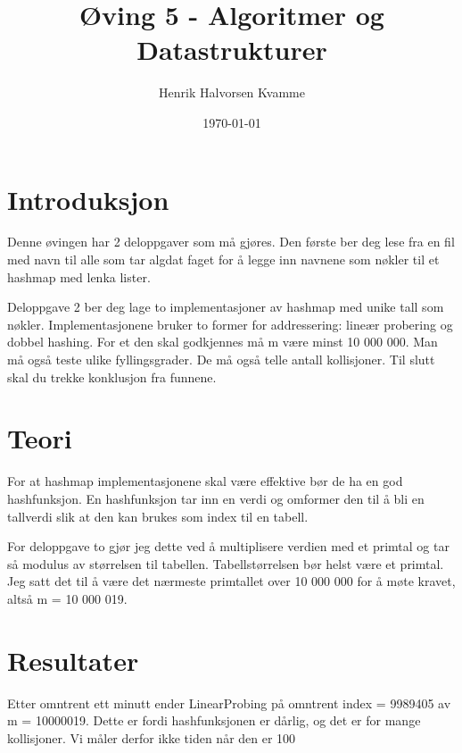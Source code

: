 \documentclass[12pt,a4paper]{article}
\title{Øving 5 - Algoritmer og Datastrukturer}
\author{Henrik Halvorsen Kvamme}
\date{\today}
\begin{document}
\maketitle

\section{Introduksjon}
Denne øvingen har 2 deloppgaver som må gjøres. Den første ber deg lese fra en fil med navn til alle som tar algdat faget for å legge inn navnene som nøkler til et hashmap med lenka lister.

Deloppgave 2 ber deg lage to implementasjoner av hashmap med unike tall som nøkler. Implementasjonene bruker to former for addressering: lineær probering og dobbel hashing. For et den skal godkjennes må m være minst 10 000 000. Man må også teste ulike fyllingsgrader. De må også telle antall kollisjoner. Til slutt skal du trekke konklusjon fra funnene.

\section{Teori}
For at hashmap implementasjonene skal være effektive bør de ha en god hashfunksjon. En hashfunksjon tar inn en verdi og omformer den til å bli en tallverdi slik at den kan brukes som index til en tabell.

For deloppgave to gjør jeg dette ved å multiplisere verdien med et primtal og tar så modulus av størrelsen til tabellen. Tabellstørrelsen bør helst være et primtal. Jeg satt det til å være det nærmeste primtallet over 10 000 000 for å møte kravet, altså m = 10 000 019.

\newpage

\section{Resultater}
Etter omntrent ett minutt ender LinearProbing på omntrent index = 9989405 av m = 10000019.
Dette er fordi hashfunksjonen er dårlig, og det er for mange kollisjoner. Vi måler derfor ikke tiden når den er 100%
\end{document}
